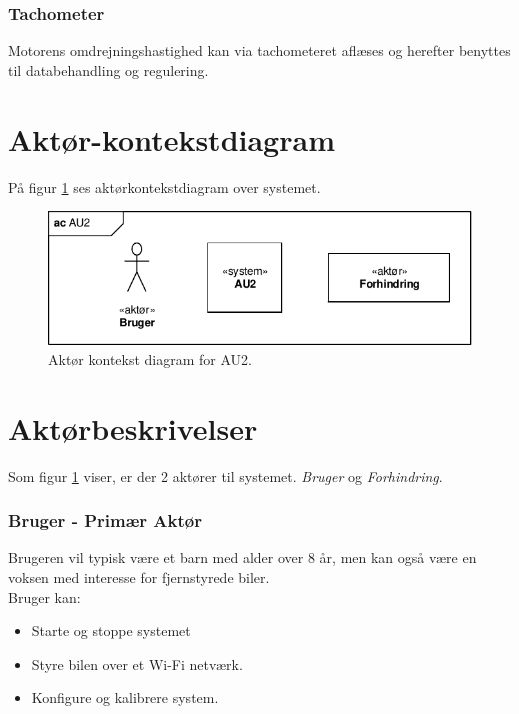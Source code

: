 \subsubsection{Tachometer}
Motorens omdrejningshastighed kan via tachometeret aflæses og herefter benyttes til databehandling og regulering. 
\clearpage


\section{Aktør-kontekstdiagram} \label{sec:aktor-kontekstdiagram}
På figur \ref{fig:aktor_kontekst} ses aktørkontekstdiagram over systemet. 

\begin{figure}[h]
\centering
\includegraphics[scale=1.1]{../fig/diagrammer/ac_au2.pdf}
\caption{Aktør kontekst diagram for AU2.}
\label{fig:aktor_kontekst}
\end{figure}


\section{Aktørbeskrivelser} \label{sec:aktorbeskrivelser}
Som figur \ref{fig:aktor_kontekst} viser, er der 2 aktører til systemet.
\textit{Bruger} og \textit{Forhindring}.

\subsubsection{Bruger - Primær Aktør}
Brugeren vil typisk være et barn med alder over 8 år, men kan også være en voksen med interesse for fjernstyrede biler.
\\ %
Bruger kan:
\begin{itemize}
	\item Starte og stoppe systemet 
	\item Styre bilen over et Wi-Fi netværk.
	\item Konfigure og kalibrere system.
\end{itemize}

